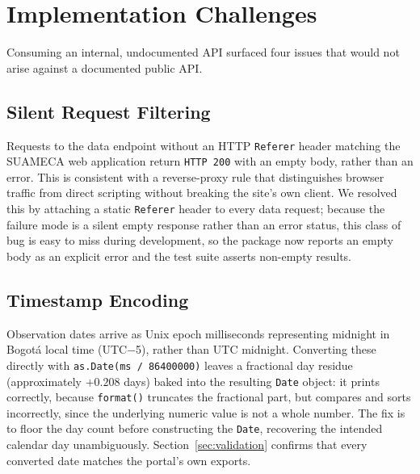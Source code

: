 \documentclass[conference]{IEEEtran}
\begin{document}
\section{Implementation Challenges}

Consuming an internal, undocumented API surfaced four issues that would
not arise against a documented public API.

\subsection{Silent Request Filtering}
Requests to the data endpoint without an HTTP \texttt{Referer} header
matching the SUAMECA web application return \texttt{HTTP 200} with an
empty body, rather than an error. This is consistent with a
reverse-proxy rule that distinguishes browser traffic from direct
scripting without breaking the site's own client. We resolved this by
attaching a static \texttt{Referer} header to every data request; because
the failure mode is a silent empty response rather than an error status,
this class of bug is easy to miss during development, so the package
now reports an empty body as an explicit error and the test suite
asserts non-empty results.

\subsection{Timestamp Encoding}
Observation dates arrive as Unix epoch milliseconds representing midnight
in Bogot\'a local time (UTC$-$5), rather than UTC midnight. Converting
these directly with \texttt{as.Date(ms / 86400000)} leaves a fractional
day residue (approximately $+0.208$ days) baked into the resulting
\texttt{Date} object: it prints correctly, because \texttt{format()}
truncates the fractional part, but compares and sorts incorrectly, since
the underlying numeric value is not a whole number. The fix is to floor
the day count before constructing the \texttt{Date}, recovering the
intended calendar day unambiguously. Section~\ref{sec:validation} confirms
that every converted date matches the portal's own exports.
\end{document}
